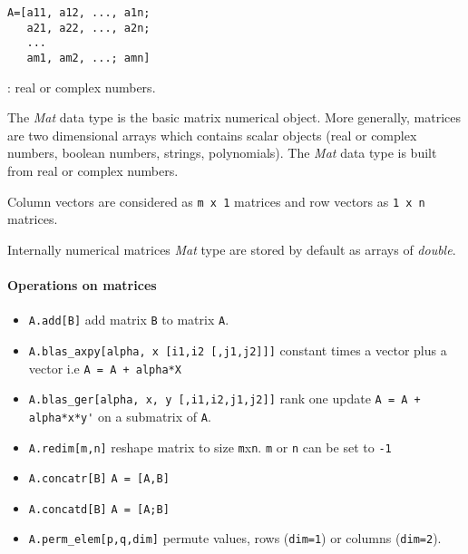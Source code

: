 
\begin{mandesc}
\end{mandesc}
\begin{calling_sequence}
\begin{verbatim}
A=[a11, a12, ..., a1n;
   a21, a22, ..., a2n;
   ...
   am1, am2, ...; amn]
\end{verbatim}
\end{calling_sequence}
\begin{parameters}
  \begin{varlist}
    : real or complex numbers.
  \end{varlist}
\end{parameters}

\begin{mandescription}

The \emph{Mat} data type is the basic matrix numerical object. 
More generally, matrices are two dimensional arrays which contains
scalar objects (real or complex numbers, boolean numbers, strings,
polynomials). The \emph{Mat} data type is built from real or complex
numbers.

Column vectors are considered as \verb!m x 1! matrices and row vectors
as \verb!1 x n! matrices.

Internally numerical matrices \emph{Mat} type are stored by default as 
arrays of \emph{double}. 
\end{mandescription}

\paragraph{Operations on matrices}
\begin{itemize}
\item \verb+A.add[B]+  add matrix \verb+B+ to matrix \verb+A+.
\item \verb+A.blas_axpy[alpha, x [i1,i2 [,j1,j2]]]+ constant times a vector plus a vector i.e \verb!A = A + alpha*X!
\item \verb+A.blas_ger[alpha, x, y [,i1,i2,j1,j2]]+  rank one update \verb!A = A + alpha*x*y'!
  on a submatrix of \verb+A+.
\end{itemize}
\begin{itemize}
\item \verb+A.redim[m,n]+ reshape matrix to size \verb+m+x\verb+n+. \verb+m+ or \verb+n+ can be set to \verb+-1+ 
\item \verb+A.concatr[B]+ \verb+A = [A,B]+
\item \verb+A.concatd[B]+ \verb+A = [A;B]+
\item \verb+A.perm_elem[p,q,dim]+ permute values, rows (\verb+dim=1+) or columns (\verb+dim=2+).
\end{itemize}


